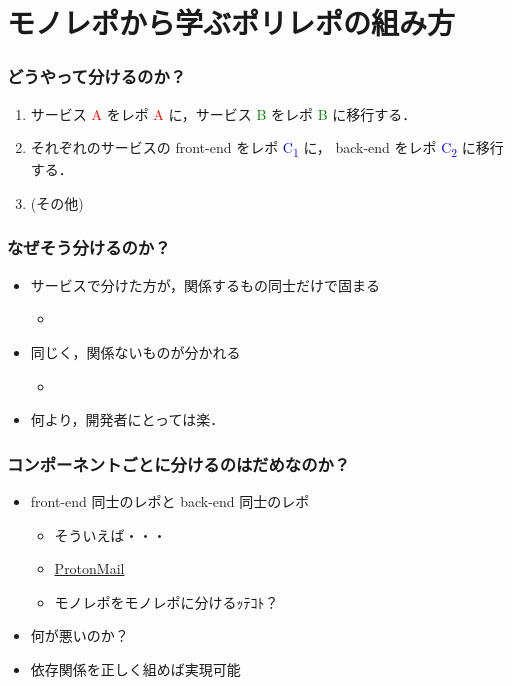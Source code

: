 \section{モノレポから学ぶポリレポの組み方}

\begin{frame}
    \frametitle{どうやって分けるのか？}
    \begin{enumerate}
        \item<2-> サービス \textcolor{red}{A} をレポ \textcolor{red}{A} に，サービス \textcolor{green}{B} をレポ \textcolor{green}{B} に移行する．
        \item<3-> それぞれのサービスの front-end をレポ \textcolor{blue}{C\textsubscript{1}} に， back-end をレポ \textcolor{blue}{C\textsubscript{2}} に移行する．
        \item<4-> (その他)
    \end{enumerate}
\end{frame}

\begin{frame}
    \frametitle{なぜそう分けるのか？}
    \begin{itemize}
        \item<2-> サービスで分けた方が，関係するもの同士だけで固まる
        \begin{itemize}
            \item<3-> 
        \end{itemize}
        \item<4-> 同じく，関係ないものが分かれる
        \begin{itemize}
            \item<5-> 
        \end{itemize}
        \item<6-> 何より，開発者にとっては楽．
    \end{itemize}
\end{frame}

\begin{frame}
    \frametitle{コンポーネントごとに分けるのはだめなのか？}

    \begin{itemize}
        \item<2-> front-end 同士のレポと back-end 同士のレポ
        \begin{itemize}
            \item<3-> そういえば・・・
            \item<4-> \href{https://github.com/ProtonMail/WebClients}{ProtonMail}
            \item<5-> モノレポをモノレポに分けるｯﾃｺﾄ？
        \end{itemize}
        \item<6-> 何が悪いのか？
        \item<7-> 依存関係を正しく組めば実現可能
    \end{itemize}
\end{frame}
